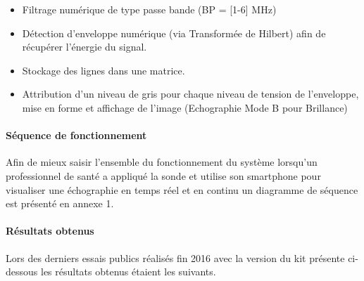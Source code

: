 \documentclass[12pt]{article}
\begin{document}
\vspace{10pt}

\begin{itemize}
\item Filtrage numérique de type passe bande (BP = [1-6] MHz)
\item Détection d'enveloppe numérique (via Transformée de Hilbert) afin de récupérer l'énergie du signal.
\item Stockage des lignes dans une matrice. 
\item Attribution d'un niveau de gris pour chaque niveau de tension de l'enveloppe, mise en forme et affichage de l'image (Echographie Mode B pour Brillance)
\end{itemize}

\paragraph{Séquence de fonctionnement}

Afin de mieux saisir l'ensemble du fonctionnement du système lorsqu'un professionnel de santé a appliqué la sonde et utilise son smartphone pour visualiser une échographie en temps réel et en continu un diagramme de séquence est présenté en annexe 1.


\paragraph{Résultats obtenus}

Lors des derniers essais publics réalisés fin 2016 avec la version du kit présente ci-dessous les résultats obtenus étaient les suivants.\par

\vspace{10pt}
\end{document}
